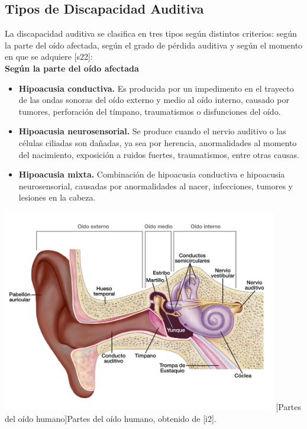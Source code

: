 \subsection{Tipos de Discapacidad Auditiva}
La discapacidad auditiva se clasifica en tres tipos según distintos criterios: según la parte del oído afectada, según el grado de pérdida auditiva y según el momento en que se adquiere [s22]:\\
\newline\textbf{Según la parte del oído afectada}
\begin{itemize}
    \item \textbf{Hipoacusia conductiva.} Es producida por un impedimento en el trayecto de las ondas sonoras del oído externo y medio al oído interno, causado por tumores, perforación del tímpano, traumatismos o disfunciones del oído.  
    \item \textbf{Hipoacusia neurosensorial.} Se produce cuando el nervio auditivo o las células ciliadas son dañadas, ya sea por herencia, anormalidades al momento del nacimiento, exposición a ruidos fuertes, traumatismos, entre otras causas.  
    \item \textbf{Hipoacusia mixta.} Combinación de hipoacusia conductiva e hipoacusia neurosensorial, causadas por anormalidades al nacer, infecciones, tumores y lesiones en la cabeza.  
\end{itemize}

\begin{center}
    \includegraphics[width=0.9\textwidth]{Images/Cap 2/PartesOido.jpg}
    [Partes del oído humano]{Partes del oído humano, obtenido de [i2].} 
\end{center}

